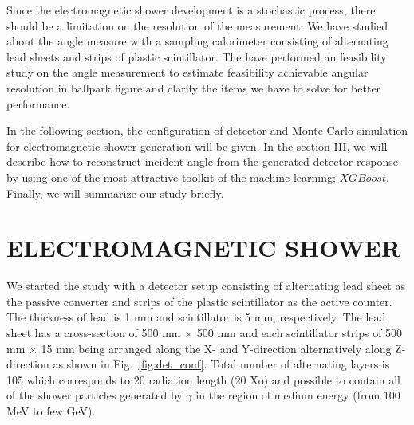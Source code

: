 \documentclass[jkps,preprint,fleqn,showpacs,showkeys]{revtex4}
\newcommand{\XGB}{XGBoost}
\begin{document}
Since the electromagnetic shower development is a stochastic process, there should be a limitation on the resolution of the measurement. We have studied about the angle measure with a sampling calorimeter consisting of alternating lead sheets and strips of plastic scintillator. The have performed an feasibility study on the angle measurement to estimate feasibility  achievable angular resolution in ballpark figure and clarify the items we have to solve for better performance.

In the following section, the configuration of detector and Monte Carlo simulation for electromagnetic shower generation will be given. In the section III, we will describe how to reconstruct incident angle from the generated detector response by using one of the most attractive toolkit of the machine learning; $\XGB$. Finally, we will summarize our study briefly.

\section{ELECTROMAGNETIC SHOWER}
We started the study with a detector setup consisting of alternating lead sheet as the passive converter and strips of the plastic scintillator as the active counter. %
The thickness of lead is 1 mm and scintillator is 5 mm, respectively. The lead sheet has a cross-section of  500 mm $\times$ 500 mm and each scintillator strips of 500 mm $\times$ 15 mm  being arranged along the X- and Y-direction alternatively along Z-direction as shown in  Fig.~\ref{fig:det_conf}. Total number of alternating layers is 105 which corresponds to 20 radiation length (20 Xo) and possible to contain all of the shower particles generated by $\gamma$ in the region of medium energy (from  100 MeV to few GeV). 
 
\end{document}
